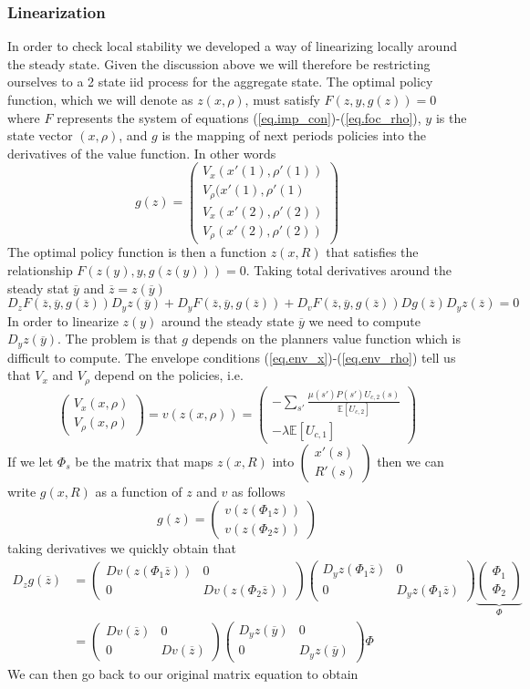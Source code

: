 \documentclass[thmsb,11pt]{article}
\newcommand{\bmat}{\begin{matrix}}
\newcommand{\emat}{\end{matrix}}
\newcommand{\ov}{\overline}
\begin{document}
\subsubsection{Linearization}  In order to check local stability we developed a way of linearizing locally around the steady state.  Given the discussion above we will therefore be restricting ourselves to a 2 state iid process for the aggregate state.  The optimal policy function, which we will denote as $z(x,\rho)$, must satisfy $F(z,y,g(z)) = 0$ where $F$ represents the system of equations (\ref{eq.imp_con})-(\ref{eq.foc_rho}), $y$ is the state vector $(x,\rho)$, and $g$ is the mapping of next periods policies into the derivatives of the value function.  In other words
\[
	g(z) = \left(\bmat V_x(x'(1),\rho'(1))\\ V_{\rho}(x'(1),\rho'(1)\\ V_x(x'(2),\rho'(2))\\ V_{\rho}(x'(2),\rho'(2))\emat\right)
\]The optimal policy function is then a function $z(x,R)$ that satisfies the relationship $F(z(y),y,g(z(y))) = 0$.  Taking total derivatives around the steady stat $\ov y$ and $\ov z = z(\ov y)$
\[
	D_zF(\ov z,\ov y, g(\ov z))D_yz(\ov y)+D_yF(\ov z, \ov y, g(\ov z)) + D_v F(\ov z, \ov y, g(\ov z)) D g(\ov z) D_y z(\ov z) = 0
\]  In order to linearize $z(y)$ around the steady state $\ov y$ we need to compute $D_y z(\ov y)$.  The problem is that $g$ depends on the planners value function which is difficult to compute.  The envelope conditions (\ref{eq.env_x})-(\ref{eq.env_rho}) tell us that $V_x$ and $V_{\rho}$ depend on the policies, i.e.
\[
	\left(\bmat V_x(x,\rho)\\ V_{\rho}(x,\rho)\emat\right) = v( z(x,\rho) ) =  \left(\bmat -\sum_{s'}\frac{\mu(s') P(s')U_{c,2}(s)}{\mathbb E\left[U_{c,2}\right]}\\ -\lambda \mathbb E\left[U_{c,1}\right]\emat\right)
\]  If we let $\Phi_s$ be the matrix that maps $z(x,R)$ into $\left(\bmat x'(s)\\ R'(s)\emat\right)$ then we can write $g(x,R)$ as a function of $z$ and $v$ as follows
\[
	g(z) = \left(\bmat v(z(\Phi_1 z))\\ v(z(\Phi_2 z))\emat\right)
\]taking derivatives we quickly obtain that
\begin{align*}
	D_z g(\ov z) &= \left(\bmat D v(z(\Phi_1 \ov z)) & 0 \\ 0&  D v(z(\Phi_2 \ov z))\emat\right)\left(\bmat D_y z(\Phi_1 \ov z) & 0\\ 0& D_y z(\Phi_1\ov z)\emat\right) \underbrace{\left(\bmat \Phi_1\\ \Phi_2\emat\right)}_{\Phi}\\
	&=\left(\bmat Dv(\ov z) &0\\0& D v(\ov z)\emat\right)\left(\bmat D_y z(\ov y) &0\\0&D_y z(\ov y)\emat\right)\Phi
\end{align*}  We can then go back to our original matrix equation to obtain
\end{document}
